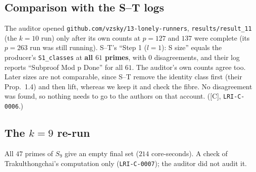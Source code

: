 \documentclass[10pt]{article}
\newcommand{\tier}[1]{\textsf{[#1]}}
\newcommand{\tC}{\tier{C}}
\begin{document}
\subsection{Comparison with the S--T logs}
The auditor opened \texttt{github.com/vzsky/13-lonely-runners}, \texttt{results/result\_11} (the $k=10$ run) only after its own counts at $p=127$ and $137$ were complete (its $p=263$ run was still running). S--T's ``Step 1 ($l=1$): S size'' equals the producer's \texttt{S1\_classes} at \textbf{all $61$ primes}, with $0$ disagreements, and their log reports ``Subproof Mod p Done'' for all $61$. The auditor's own counts agree too. Later sizes are not comparable, since S--T remove the identity class first (their Prop.~1.4) and then lift, whereas we keep it and check the fibre. No disagreement was found, so nothing needs to go to the authors on that account. (\tC{}, \texttt{LRI-C-0006}.)

\subsection{The $k=9$ re-run}
All $47$ primes of $S_9$ give an empty final set ($214$ core-seconds). A check of Trakulthongchai's computation only (\texttt{LRI-C-0007}); the auditor did not audit it.

\end{document}
